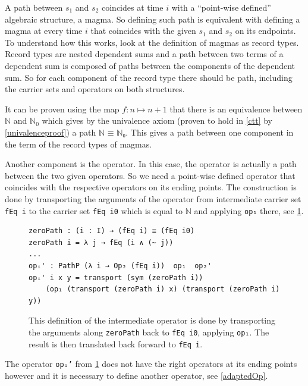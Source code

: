 \documentclass[12pt,a4paper,twoside,xetex,draft]{book}
\begin{document}
A path between $s_1$ and $s_2$ coincides at time $i$ with a ``point-wise defined'' algebraic structure, a magma. So defining such path is equivalent with defining a magma at every time $i$ that coincides with the given $s_1$ and $s_2$ on its endpoints. To understand how this works, look at the definition of magmas as record types. Record types are nested dependent sums and a path between two terms of a dependent sum is composed of paths between the components of the dependent sum. So for each component of the record type there should be path, including the carrier sets and operators on both structures. 

It can be proven using the map $f: n \mapsto n + 1$ that there is an equivalence between $\mathbb{N}$ and $\mathbb{N}_0$ which gives by the univalence axiom (proven to hold in \cref{ctt} by \cref{univalenceproof}) a path $\texttt{ℕ ≡ ℕ₀}$. This gives a path between one component in the term of the record types of magmas. 

Another component is the operator. In this case, the operator is actually a path between the two given operators. So we need a point-wise defined operator that coincides with the respective operators on its ending points. The construction is done by transporting the arguments of the operator from intermediate carrier set \texttt{fEq i} to the carrier set \texttt{fEq i0} which is equal to $\mathbb{N}$ and applying \texttt{op₁} there, see \cref{zeroPathLift}.


\begin{figure}\label{zeroPathLift}
\centering 
\begin{BVerbatim}
zeroPath : (i : I) → (fEq i) ≡ (fEq i0)
zeroPath i = λ j → fEq (i ∧ (~ j))
...
opᵢ' : PathP (λ i → Op₂ (fEq i))  op₁  op₂'
opᵢ' i x y = transport (sym (zeroPath i))
    (op₁ (transport (zeroPath i) x) (transport (zeroPath i) y))
\end{BVerbatim}
\caption{This definition of the intermediate operator is done by transporting the arguments along \texttt{zeroPath} back to \texttt{fEq i0}, applying \texttt{op₁}. The result is then translated back forward to \texttt{fEq i}.}

\end{figure}

The operator \texttt{opᵢ'} from \cref{zeroPathLift} does not have the right operators at its ending points however and it is necessary to define another operator, see \cref{adaptedOp}.
\end{document}
